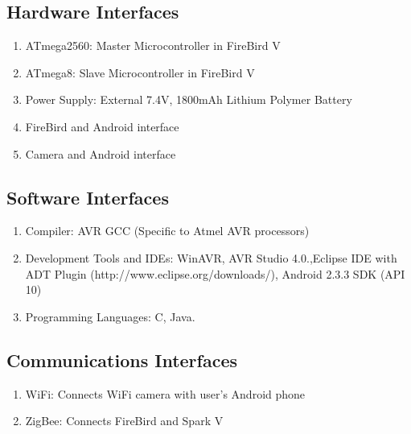 \documentclass[a4paper, 12pt]{article}
\begin{document}
\subsection{Hardware Interfaces}
\begin{enumerate}
 \item ATmega2560: Master Microcontroller in FireBird V
 \item ATmega8: Slave Microcontroller in FireBird V
 \item Power Supply: External 7.4V, 1800mAh Lithium Polymer Battery
 \item FireBird and Android interface
 \item Camera and Android interface
\end{enumerate}

\subsection{Software Interfaces}
\begin{enumerate}
 \item Compiler: AVR GCC (Specific to Atmel AVR processors)
 \item Development Tools and IDEs: WinAVR, AVR Studio 4.0.,Eclipse IDE with ADT Plugin
 (http://www.eclipse.org/downloads/), Android 2.3.3 SDK (API 10) \cite{adr}
 \item Programming Languages: C, Java.
\end{enumerate}

\subsection{Communications Interfaces}
\begin{enumerate}
 \item WiFi: Connects WiFi camera with user's Android phone
 \item ZigBee: Connects FireBird and Spark V
 \end{enumerate}
\end{document}
